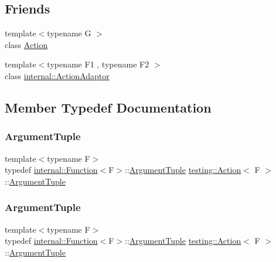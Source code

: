 \subsection*{Friends}
\begin{DoxyCompactItemize}
\item 
{\footnotesize template$<$typename G $>$ }\\class \mbox{\hyperlink{classtesting_1_1_action_a62bc48ff11968b6e45d21c4b49f349fb}{Action}}
\item 
{\footnotesize template$<$typename F1 , typename F2 $>$ }\\class \mbox{\hyperlink{classtesting_1_1_action_a66fe4f9c9b9d020273151aa6054b491e}{internal\+::\+Action\+Adaptor}}
\end{DoxyCompactItemize}


\subsection{Member Typedef Documentation}
\mbox{\label{classtesting_1_1_action_ae27fda510696a9294f991de5b1abfaf2}} 
\subsubsection{\texorpdfstring{ArgumentTuple}{ArgumentTuple}\hspace{0.1cm}{\footnotesize\ttfamily [1/3]}}
{\footnotesize\ttfamily template$<$typename F$>$ \\
typedef \mbox{\hyperlink{structtesting_1_1internal_1_1_function}{internal\+::\+Function}}$<$F$>$\+::\mbox{\hyperlink{classtesting_1_1_action_ae27fda510696a9294f991de5b1abfaf2}{Argument\+Tuple}} \mbox{\hyperlink{classtesting_1_1_action}{testing\+::\+Action}}$<$ F $>$\+::\mbox{\hyperlink{classtesting_1_1_action_ae27fda510696a9294f991de5b1abfaf2}{Argument\+Tuple}}}

\mbox{\label{classtesting_1_1_action_ae27fda510696a9294f991de5b1abfaf2}} 
\subsubsection{\texorpdfstring{ArgumentTuple}{ArgumentTuple}\hspace{0.1cm}{\footnotesize\ttfamily [2/3]}}
{\footnotesize\ttfamily template$<$typename F$>$ \\
typedef \mbox{\hyperlink{structtesting_1_1internal_1_1_function}{internal\+::\+Function}}$<$F$>$\+::\mbox{\hyperlink{classtesting_1_1_action_ae27fda510696a9294f991de5b1abfaf2}{Argument\+Tuple}} \mbox{\hyperlink{classtesting_1_1_action}{testing\+::\+Action}}$<$ F $>$\+::\mbox{\hyperlink{classtesting_1_1_action_ae27fda510696a9294f991de5b1abfaf2}{Argument\+Tuple}}}

